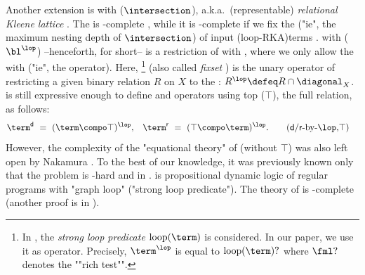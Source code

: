 \begin{scope}
Another extension is  with \emph{} ($\intersection$), a.k.a.\ (representable) \emph{relational Kleene lattice} \cite{andrekaEquationalTheoryKleene2011}.
The  is -complete \cite{nakamuraPartialDerivativesGraphs2017,brunetPetriAutomata2017,nakamuraDerivativesGraphsPositive2025},
while it is -complete if we fix the  ("ie", the maximum nesting depth of $\intersection$) of input \kl(loop-RKA){terms} \cite{nakamuraDerivativesGraphsPositive2025}.
 with \emph{} ($\bl^{\lop}$) --henceforth, \emph{} for short-- \cite{nakamuraDerivativesGraphsPositive2025} is a restriction of  with ,
where we only allow the  with  ("ie", the  operator).
Here, \footnote{In \cite{daneckiPropositionalDynamicLogic1984}, the \emph{strong loop predicate} $\mathrm{loop}(\term)$ is considered. In our paper, we use it as operator.
Precisely, $\term^{\lop}$ is equal to $\mathrm{loop}(\term)?$ where $\fml?$ denotes the ""rich test"".}
\cite{daneckiPropositionalDynamicLogic1984,nakamuraUndecidabilityPositiveCalculus2024} (also called \emph{fixset} \cite{hirschAlgebraFunctionsAntidomain2016}) is the unary operator of restricting a given binary relation $R$ on $X$ to the :
$R^{\lop} \defeq R \cap \diagonal_{X}$.
 is still expressive enough to define  and  operators using top ($\top$), the full relation, as follows:
%
\begin{align*}
\term^{\mathsf{d}} ~&=~ (\term \compo \top)^{\lop}, &
\term^{\mathsf{r}} ~&=~ (\top \compo \term)^{\lop}.
\tag{$\mathsf{d}$/$\mathsf{r}$-by-$\lop$,$\top$}\label{equation: dom range by loop top}
\end{align*}
However, the complexity of the "equational theory" of  (without $\top$) was also left open by Nakamura \cite[\S 8]{nakamuraDerivativesGraphsPositive2025}.
To the best of our knowledge, it was previously known only that the problem is -hard \cite{meyerEquivalenceProblemRegular1972} and in  \cite{daneckiPropositionalDynamicLogic1984,gollerPDLIntersectionConverse2009}.
\AP
\intro*{} \cite{daneckiPropositionalDynamicLogic1984} is propositional dynamic logic of regular programs with "graph loop" ("strong loop predicate").
The theory of  is -complete \cite{daneckiPropositionalDynamicLogic1984} (another proof is in \cite[Corollary 4.9]{gollerPDLIntersectionConverse2009}).

\end{scope}

